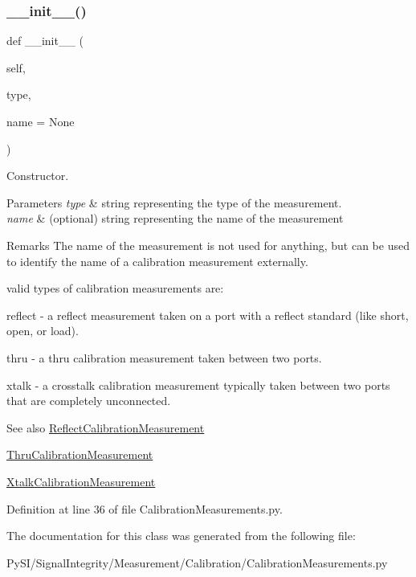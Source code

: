 \subsubsection{\texorpdfstring{\+\_\+\+\_\+init\+\_\+\+\_\+()}{\_\_init\_\_()}}
{\footnotesize\ttfamily def \+\_\+\+\_\+init\+\_\+\+\_\+ (\begin{DoxyParamCaption}\item[{}]{self,  }\item[{}]{type,  }\item[{}]{name = {\ttfamily None} }\end{DoxyParamCaption})}



Constructor. 


\begin{DoxyParams}{Parameters}
{\em type} & string representing the type of the measurement. \\
\hline
{\em name} & (optional) string representing the name of the measurement \\
\hline
\end{DoxyParams}
\begin{DoxyRemark}{Remarks}
The name of the measurement is not used for anything, but can be used to identify the name of a calibration measurement externally.
\end{DoxyRemark}
valid types of calibration measurements are\+:


\begin{DoxyItemize}
\item \textquotesingle{}reflect\textquotesingle{} -\/ a reflect measurement taken on a port with a reflect standard (like short, open, or load).
\item \textquotesingle{}thru\textquotesingle{} -\/ a thru calibration measurement taken between two ports.
\item \textquotesingle{}xtalk\textquotesingle{} -\/ a crosstalk calibration measurement typically taken between two ports that are completely unconnected. \begin{DoxySeeAlso}{See also}
\hyperlink{classSignalIntegrity_1_1Measurement_1_1Calibration_1_1CalibrationMeasurements_1_1ReflectCalibrationMeasurement}{Reflect\+Calibration\+Measurement} 

\hyperlink{classSignalIntegrity_1_1Measurement_1_1Calibration_1_1CalibrationMeasurements_1_1ThruCalibrationMeasurement}{Thru\+Calibration\+Measurement} 

\hyperlink{classSignalIntegrity_1_1Measurement_1_1Calibration_1_1CalibrationMeasurements_1_1XtalkCalibrationMeasurement}{Xtalk\+Calibration\+Measurement} 
\end{DoxySeeAlso}

\end{DoxyItemize}

Definition at line 36 of file Calibration\+Measurements.\+py.



The documentation for this class was generated from the following file\+:\begin{DoxyCompactItemize}
\item 
Py\+S\+I/\+Signal\+Integrity/\+Measurement/\+Calibration/Calibration\+Measurements.\+py\end{DoxyCompactItemize}
